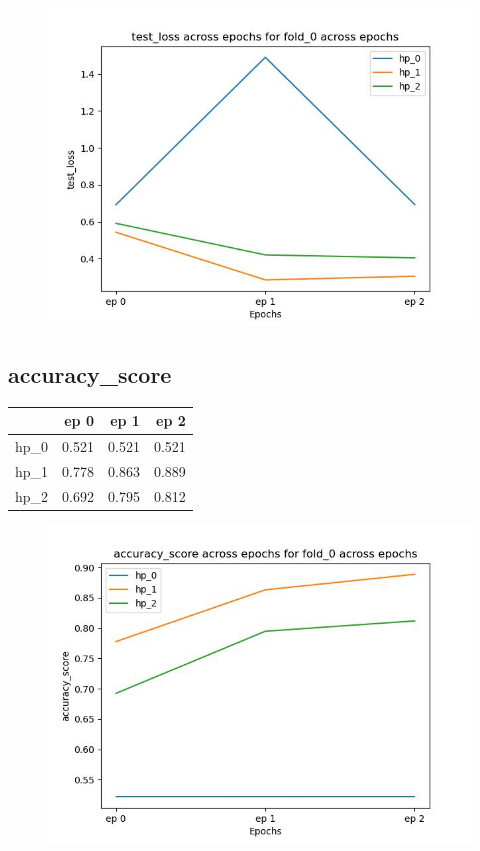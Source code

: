 \documentclass{article}
\begin{document}
\begin{figure}[H]
\includegraphics[scale = 0.75]{fold_0/test_loss}
\end{figure}
\subsection{accuracy\_score}
\begin{tabular}{lrrr}
\toprule
{} &   ep 0 &   ep 1 &   ep 2 \\
\midrule
hp\_0 &  0.521 &  0.521 &  0.521 \\
hp\_1 &  0.778 &  0.863 &  0.889 \\
hp\_2 &  0.692 &  0.795 &  0.812 \\
\bottomrule
\end{tabular}

\begin{figure}[H]
\includegraphics[scale = 0.75]{fold_0/accuracy_score}
\end{figure}
\end{document}

